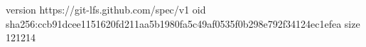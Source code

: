 version https://git-lfs.github.com/spec/v1
oid sha256:ccb91dcee1151620fd211aa5b1980fa5c49af0535f0b298e792f34124ec1efea
size 121214
